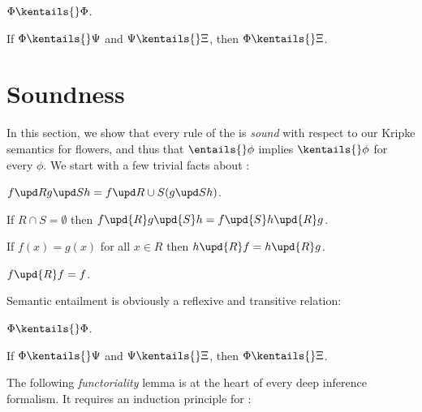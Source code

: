 \begin{scope}
\begin{fact}[Reflexivity]
  $\Phi \kentails{}\Phi$.
\end{fact}

\begin{fact}[Transitivity]
  If $\Phi \kentails{}\Psi$ and $\Psi \kentails{}\Xi$, then $\Phi \kentails{}\Xi$.
\end{fact}


\section{Soundness}

In this section, we show that every rule of the  is
\emph{sound} with respect to our Kripke semantics for flowers, and thus
that $\entails{} \phi$ implies $\kentails{} \phi$ for every $\phi$. We start
with a few trivial facts about :

\begin{fact}[Associativity]
  $\update{\update{f}{R}{g}}{S}{h} = \update{f}{R \cup S}{(\update{g}{S}{h})}$.
\end{fact}

\begin{fact}[Commutativity]
  If $R \cap S = \emptyset$ then $f \upd{R} g \upd{S} h = f \upd{S} h \upd{R}
  g$.
\end{fact}

\begin{fact}[Agreement]
  If $f(x) = g(x)$ for all $x \in R$ then $h \upd{R} f = h \upd{R} g$.
\end{fact}

\begin{fact}[Idempotency]
  $f \upd{R} f = f$.
\end{fact}

Semantic entailment is obviously a reflexive and transitive relation:

\begin{fact}[Reflexivity]
  $\Phi \kentails{} \Phi$.
\end{fact}

\begin{fact}[Transitivity]
  If $\Phi \kentails{} \Psi$ and $\Psi \kentails{} \Xi$, then $\Phi \kentails{} \Xi$.
\end{fact}

The following \emph{functoriality} lemma is at the heart of every deep inference
formalism. It requires an induction principle for \emph{}:


\end{scope}
